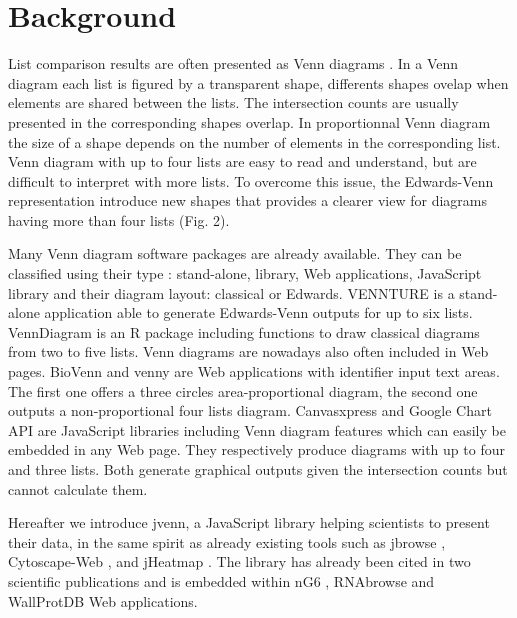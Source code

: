 \documentclass{bmcart}
\begin{document}


\section*{Background}

List comparison results are often presented as Venn diagrams \cite{Venn1880}. In
a Venn diagram each list is figured by a transparent shape, differents shapes 
ovelap when elements are shared between the lists. The intersection counts are 
usually presented in the corresponding shapes overlap. In proportionnal Venn 
diagram the size of a shape depends on the number of elements in the
corresponding list. Venn diagram with up to four lists are easy to read and 
understand, but are difficult to interpret with more lists. To overcome this
issue, the Edwards-Venn \cite{Edwards2004} representation introduce new shapes 
that provides a clearer view for diagrams having more than four lists (Fig. 2).

Many Venn diagram software packages are already available. They can be
classified using their type : stand-alone, library, Web applications, JavaScript
library and their diagram layout: classical or Edwards. VENNTURE
\cite{Bronwen2012} is a stand-alone application able to generate Edwards-Venn
outputs for up to six lists. VennDiagram \cite{RVennDiagram} is an R package
including functions to draw classical diagrams from two to five lists. Venn 
diagrams are nowadays also often included in Web pages. BioVenn
\cite{Hulsen2008} and venny \cite{venny} are Web applications  with identifier 
input text areas. The first one offers a three circles  area-proportional
diagram, the second one outputs a non-proportional four lists diagram.
Canvasxpress \cite{canvasxpress} and Google Chart API \cite{googleAPI} are 
JavaScript libraries including Venn diagram features which can easily be
embedded in any Web page. They respectively produce diagrams with up to four 
and three lists. Both generate graphical outputs given the intersection counts 
but cannot calculate them.

Hereafter we introduce jvenn, a JavaScript library helping scientists to present
their data, in the same spirit as already existing tools such as jbrowse 
\cite{Westesson01032013}, Cytoscape-Web \cite{Lopes2010}, and jHeatmap 
\cite{DeuPons2014}. The library has already been cited in two scientific 
publications \cite{Bianchia2013, Aravindraja2013} and is embedded within nG6
\cite{Mariette2012}, RNAbrowse \cite{Mariette} and WallProtDB \cite{SanClemente}
Web applications.
\end{document}
